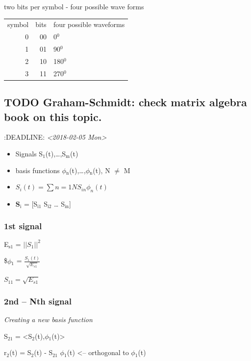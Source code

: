 \documentclass[11pt]{article}
\begin{document}
two bits per symbol - four possible wave forms
\begin{center}
\begin{tabular}{rrl}
symbol & bits & four possible waveforms\\
0 & 00 & 0$^{\text{0}}$\\
1 & 01 & 90$^{\text{0}}$\\
2 & 10 & 180$^{\text{0}}$\\
3 & 11 & 270$^{\text{0}}$\\
\end{tabular}
\end{center}

\subsection{{\bfseries\sffamily TODO} Graham-Schmidt: check matrix algebra book on this topic.}
\label{sec-1-3}
:DEADLINE: \textit{<2018-02-05 Mon>}

\begin{itemize}
\item Signals S$_{\text{1}}$(t),\ldots{},S$_{\text{m}}$(t)
\item basis functions $\phi$$_{\text{n}}$(t),\ldots{},$\phi$$_{\text{n}}$(t), N $\neq$ M
\item \(S_i(t) = \sum{n=1}{N}{S_{in} \phi_n(t)}\)
\item \textbf{S$_{\text{i}}$} = [S$_{\text{i1}}$ S$_{\text{i2}}$ \ldots{} S$_{\text{in}}$]
\end{itemize}

\subsubsection{1st signal}
\label{sec-1-3-1}

E$_{\text{s1}}$ = $||S_{1}||^2$

\$$\phi$$_{\text{1}}$ = $\frac{S_1(t)}{\sqrt{E_{s1}}}$

$S_{11} = \sqrt{E_{s1}}$

\subsubsection{2nd -- Nth signal}
\label{sec-1-3-2}
\emph{Creating a new basis function}

S$_{\text{21}}$ = <S$_{\text{2}}$(t),$\phi$$_{\text{1}}$(t)>



r$_{\text{2}}$(t) = S$_{\text{2}}$(t) - S$_{\text{21}}$ $\phi$$_{\text{1}}$(t) <-- orthogonal to $\phi$$_{\text{1}}$(t)
\end{document}
